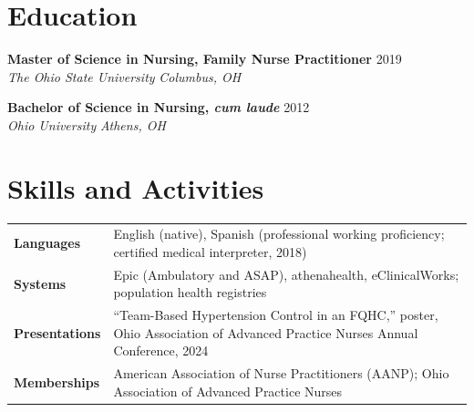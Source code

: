\documentclass[10pt,letterpaper]{article}
\newcommand{\cventry}[4]{%
  \textbf{#1} \hfill #2\\
  \textit{#3} \hfill \textit{#4}\par\vspace{1pt}%
}
\begin{document}
\section{Education}
\cventry{Master of Science in Nursing, Family Nurse Practitioner}{2019}{The Ohio State University}{Columbus, OH}
\cventry{Bachelor of Science in Nursing, \textit{cum laude}}{2012}{Ohio University}{Athens, OH}

\section{Skills and Activities}
\begin{tabularx}{\linewidth}{@{}l X@{}}
\textbf{Languages} & English (native), Spanish (professional working proficiency; certified medical interpreter, 2018) \\
\textbf{Systems} & Epic (Ambulatory and ASAP), athenahealth, eClinicalWorks; population health registries \\
\textbf{Presentations} & ``Team-Based Hypertension Control in an FQHC,'' poster, Ohio Association of Advanced Practice Nurses Annual Conference, 2024 \\
\textbf{Memberships} & American Association of Nurse Practitioners (AANP); Ohio Association of Advanced Practice Nurses \\
\end{tabularx}
\end{document}
